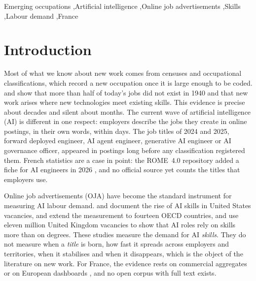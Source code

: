 \documentclass[3p,times,10pt,authoryear]{elsarticle}
\begin{document}
\begin{frontmatter}
\begin{keyword}
Emerging occupations \sep Artificial intelligence \sep Online job advertisements \sep Skills \sep Labour demand \sep France
\end{keyword}
\end{frontmatter}

\noindent{}

\section{Introduction}\label{sec:intro}
Most of what we know about new work comes from censuses and occupational classifications, which record a new occupation once it is large enough to be coded. \citet{lin2011} and \citet{autor2024} show that more than half of today's jobs did not exist in 1940 and that new work arises where new technologies meet existing skills. This evidence is precise about decades and silent about months. The current wave of artificial intelligence (AI) is different in one respect: employers describe the jobs they create in online postings, in their own words, within days. The job titles of 2024 and 2025, forward deployed engineer, AI agent engineer, generative AI engineer or AI governance officer, appeared in postings long before any classification registered them. French statistics are a case in point: the ROME~4.0 repository added a fiche for AI engineers in 2026 \citep{rome2026}, and no official source yet counts the titles that employers use.

Online job advertisements (OJA) have become the standard instrument for measuring AI labour demand. \citet{alekseeva2021} and \citet{acemoglu2022} document the rise of AI skills in United States vacancies, \citet{squicciarini2021} and \citet{borgonovi2023} extend the measurement to fourteen OECD countries, and \citet{bone2025} use eleven million United Kingdom vacancies to show that AI roles rely on skills more than on degrees. These studies measure the demand for AI \emph{skills}. They do not measure when a \emph{title} is born, how fast it spreads across employers and territories, when it stabilises and when it disappears, which is the object of the literature on new work. For France, the evidence rests on commercial aggregates \citep{pwc2025} or on European dashboards \citep{cedefop2019}, and no open corpus with full text exists.
\end{document}
